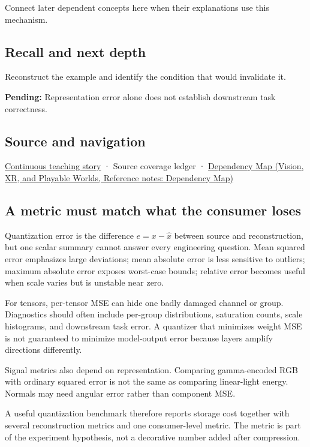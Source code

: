 \hypertarget{appendix-537171d69d27-used-by}{}

Connect later dependent concepts here when their explanations use this mechanism.

\subsection{Recall and next depth}\label{appendix-537171d69d27-recall-and-next-depth}

\hypertarget{appendix-537171d69d27-recall-and-next-depth}{}

Reconstruct the example and identify the condition that would invalidate it.

\textbf{Pending:} Representation error alone does not establish downstream task correctness.

\subsection{Source and navigation}\label{appendix-537171d69d27-source-and-navigation}

\hypertarget{appendix-537171d69d27-source-and-navigation}{}

\hyperref[01-foundations-i-ch001-choosing-what-information-to-keep]{Continuous teaching story} · {Source coverage ledger} · \href{../07-Vision-XR-and-Playable-Worlds/main.pdf\#nameddest=appendix-4ad47bdd269a}{Dependency Map (Vision, XR, and Playable Worlds, Reference notes: Dependency Map)}

\subsection{A metric must match what the consumer loses}\label{appendix-537171d69d27-a-metric-must-match-what-the-consumer-loses}

\hypertarget{appendix-537171d69d27-a-metric-must-match-what-the-consumer-loses}{}

Quantization error is the difference \(e=x-\hat x\) between source and reconstruction, but one scalar summary cannot answer every engineering question. Mean squared error emphasizes large deviations; mean absolute error is less sensitive to outliers; maximum absolute error exposes worst-case bounds; relative error becomes useful when scale varies but is unstable near zero.

For tensors, per-tensor MSE can hide one badly damaged channel or group. Diagnostics should often include per-group distributions, saturation counts, scale histograms, and downstream task error. A quantizer that minimizes weight MSE is not guaranteed to minimize model-output error because layers amplify directions differently.

Signal metrics also depend on representation. Comparing gamma-encoded RGB with ordinary squared error is not the same as comparing linear-light energy. Normals may need angular error rather than component MSE.

A useful quantization benchmark therefore reports storage cost together with several reconstruction metrics and one consumer-level metric. The metric is part of the experiment hypothesis, not a decorative number added after compression.
